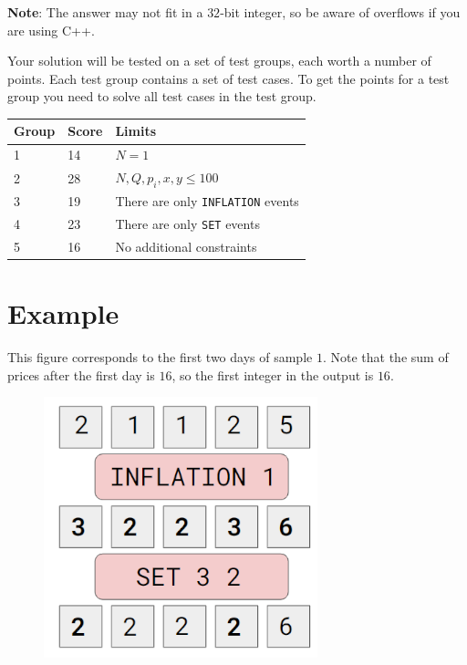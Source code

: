 \noindent
\textbf{Note}: The answer may not fit in a $32$-bit integer, so be aware of overflows if you are using C++.

Your solution will be tested on a set of test groups, each worth a number of points. 
Each test group contains a set of test cases. To get the points for a test group you need to 
solve all test cases in the test group.

\noindent
\begin{tabular}{| l | l | l |}
\hline
Group & Score & Limits \\ \hline
  1      & 14      & $N=1$\\ \hline
  2      & 28      & $N, Q, p_i, x, y \leq 100$  \\ \hline
  3      & 19      & There are only \verb|INFLATION| events  \\ \hline
  4      & 23      & There are only \verb|SET| events  \\ \hline
  5      & 16      & No additional constraints  \\ \hline
\end{tabular}

\section*{Example}

This figure corresponds to the first two days of sample $1$. Note that the sum of prices after the
first day is $16$, so the first integer in the output is $16$.
\begin{figure}[h]
  \centering
  \includegraphics{inflation-sample-2.png}
\end{figure}
